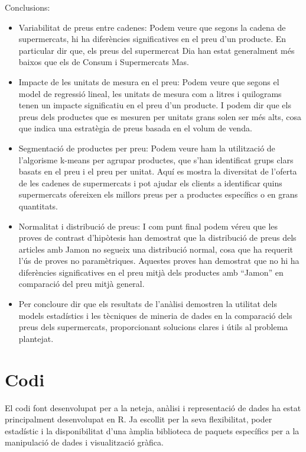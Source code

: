 \documentclass[
]{article}
\begin{document}
Conclusions:

\begin{itemize}
\item
  Variabilitat de preus entre cadenes: Podem veure que segons la cadena
  de supermercats, hi ha diferències significatives en el preu d'un
  producte. En particular dir que, els preus del supermercat Dia han
  estat generalment més baixos que els de Consum i Supermercats Mas.
\item
  Impacte de les unitats de mesura en el preu: Podem veure que segons el
  model de regressió lineal, les unitats de mesura com a litres i
  quilograms tenen un impacte significatiu en el preu d'un producte. I
  podem dir que els preus dels productes que es mesuren per unitats
  grans solen ser més alts, cosa que indica una estratègia de preus
  basada en el volum de venda.
\item
  Segmentació de productes per preu: Podem veure ham la utilització de
  l'algorisme k-means per agrupar productes, que s'han identificat grups
  clars basats en el preu i el preu per unitat. Aquí es mostra la
  diversitat de l'oferta de les cadenes de supermercats i pot ajudar els
  clients a identificar quins supermercats ofereixen els millors preus
  per a productes específics o en grans quantitats.
\item
  Normalitat i distribució de preus: I com punt final podem véreu que
  les proves de contrast d'hipòtesis han demostrat que la distribució de
  preus dels articles amb Jamon no segueix una distribució normal, cosa
  que ha requerit l'ús de proves no paramètriques. Aquestes proves han
  demostrat que no hi ha diferències significatives en el preu mitjà
  dels productes amb ``Jamon'' en comparació del preu mitjà general.
\item
  Per concloure dir que els resultats de l'anàlisi demostren la utilitat
  dels models estadístics i les tècniques de mineria de dades en la
  comparació dels preus dels supermercats, proporcionant solucions
  clares i útils al problema plantejat.
\end{itemize}

\hypertarget{codi}{%
\section{Codi}\label{codi}}

El codi font desenvolupat per a la neteja, anàlisi i representació de
dades ha estat principalment desenvolupat en R. Ja escollit per la seva
flexibilitat, poder estadístic i la disponibilitat d'una àmplia
biblioteca de paquets específics per a la manipulació de dades i
visualització gràfica.
\end{document}

